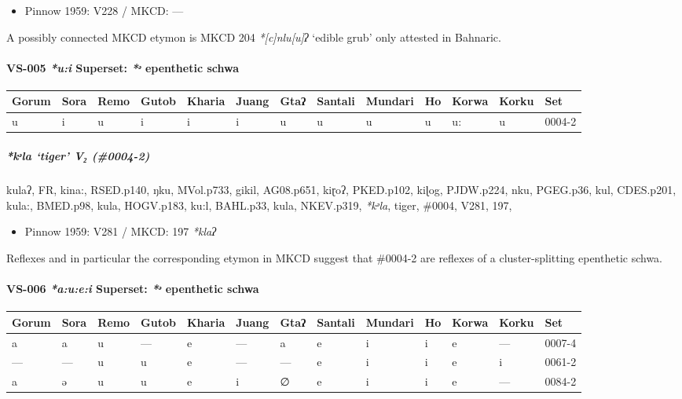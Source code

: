 \documentclass[a4paper,]{article}
\providecommand{\tightlist}{%
  \setlength{\itemsep}{0pt}\setlength{\parskip}{0pt}}
\let\oldparagraph\paragraph
\renewcommand{\paragraph}[1]{\oldparagraph{#1}\mbox{}}
\let\oldsubparagraph\subparagraph
\renewcommand{\subparagraph}[1]{\oldsubparagraph{#1}\mbox{}}
\begin{document}
\begin{itemize}
\tightlist
\item
  Pinnow 1959: V228 / MKCD: ---
\end{itemize}

A possibly connected MKCD etymon is MKCD 204 \emph{*{[}c{]}nlu{[}u{]}ʔ}
`edible grub' only attested in Bahnaric.

\paragraph{\texorpdfstring{VS-005 \emph{*u:i} Superset: \emph{*ᵊ}
epenthetic
schwa}{VS-005 *u:i Superset: *ᵊ epenthetic schwa}}\label{vs-005-ui-superset-ux1d4a-epenthetic-schwa}

\begin{longtable}[]{@{}lllllllllllll@{}}
\toprule
Gorum & Sora & Remo & Gutob & Kharia & Juang & Gtaʔ & Santali & Mundari
& Ho & Korwa & Korku & Set\tabularnewline
\midrule
\endhead
u & i & u & i & i & i & u & u & u & u & u: & u & 0004-2\tabularnewline
\bottomrule
\end{longtable}

\subparagraph{\texorpdfstring{\emph{*kᵊla} `tiger' V₂
(\#0004-2)}{*kᵊla tiger V₂ (\#0004-2)}}\label{kux1d4ala-tiger-v-0004-2}

kulaʔ, FR, kina:, RSED.p140, ŋku, MVol.p733, gikil, AG08.p651, kiɽoʔ,
PKED.p102, kiɭog, PJDW.p224, nku, PGEG.p36, kul, CDES.p201, kula:,
BMED.p98, kula, HOGV.p183, ku:l, BAHL.p33, kula, NKEV.p319,
\emph{*kᵊla}, tiger, \#0004, V281, 197,

\begin{itemize}
\tightlist
\item
  Pinnow 1959: V281 / MKCD: 197 \emph{*klaʔ}
\end{itemize}

Reflexes and in particular the corresponding etymon in MKCD suggest that
\#0004-2 are reflexes of a cluster-splitting epenthetic schwa.

\paragraph{\texorpdfstring{VS-006 \emph{*a:u:e:i} Superset: \emph{*ᵊ}
epenthetic
schwa}{VS-006 *a:u:e:i Superset: *ᵊ epenthetic schwa}}\label{vs-006-auei-superset-ux1d4a-epenthetic-schwa}

\begin{longtable}[]{@{}lllllllllllll@{}}
\toprule
Gorum & Sora & Remo & Gutob & Kharia & Juang & Gtaʔ & Santali & Mundari
& Ho & Korwa & Korku & Set\tabularnewline
\midrule
\endhead
a & a & u & --- & e & --- & a & e & i & i & e & --- &
0007-4\tabularnewline
--- & --- & u & u & e & --- & --- & e & i & i & e & i &
0061-2\tabularnewline
a & ə & u & u & e & i & ∅ & e & i & i & e & --- & 0084-2\tabularnewline
\bottomrule
\end{longtable}
\end{document}

